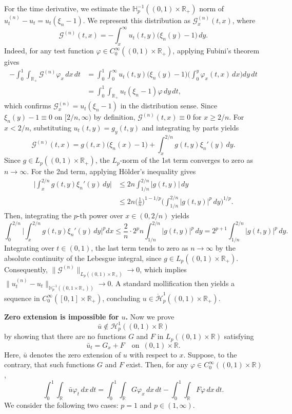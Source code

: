 \documentclass[reqno]{amsart}
\numberwithin{equation}{section}
\theoremstyle{plain}
\theoremstyle{definition}
\def\bR{\mathbb{R}}
\def\bH{\mathbb{H}}
\def\cH{\mathcal{H}}
\begin{document}
For the time derivative, we estimate the $\bH^{-1}_p((0,1)\times \bR_+)$ norm of $u^{(n)}_t - u_t = u_t(\xi_n - 1)$.
We represent this distribution as $\mathcal{G}^{(n)}_x(t,x)$, where
$$
\mathcal{G}^{(n)}(t,x) = -\int_x^\infty u_t(t,y)\big(\xi_n(y) - 1\big)\,dy.
$$
Indeed, for any test function $\varphi \in C_0^\infty((0,1)\times \bR_+)$, applying Fubini's theorem gives
\begin{align*}
-\int_0^1 \int_{\bR_+} \mathcal{G}^{(n)} \varphi_x \,dx\,dt &= \int_0^1 \int_0^\infty u_t(t,y)\big(\xi_n(y) - 1\big) \bigg(\int_0^y \varphi_x(t,x)\,dx\bigg) dy\,dt \\
&= \int_0^1 \int_{\bR_+} u_t(\xi_n - 1) \varphi \,dy\,dt,    
\end{align*}
which confirms $\mathcal{G}^{(n)}_x = u_t(\xi_n - 1)$ in the distribution sense.
Since $\xi_n(y) - 1 \equiv 0$ on $[2/n, \infty)$ by definition, $\mathcal{G}^{(n)}(t,x) \equiv 0$ for $x \ge 2/n$. 
For $x < 2/n$, substituting $u_t(t, y) = g_y(t, y)$ and integrating by parts yields
$$
\mathcal{G}^{(n)}(t,x) = g(t,x)\big(\xi_n(x) - 1\big) + \int_x^{2/n} g(t,y)\xi_n'(y)\,dy.
$$
Since $g \in L_p((0,1)\times \bR_+)$, the $L_p$-norm of the 1st term converges to zero as $n \to \infty$.
For the 2nd term, applying H\"older's inequality gives
\begin{align*}
    \bigg| \int_x^{2/n} g(t,y)\xi_n'(y)\,dy \bigg| &\le 2n \int_{1/n}^{2/n} |g(t,y)|\,dy \\
    &\le 2n \bigg(\frac{1}{n}\bigg)^{1-1/p} \bigg( \int_{1/n}^{2/n} |g(t,y)|^p\,dy \bigg)^{1/p}.
\end{align*}
Then, integrating the $p$-th power over $x \in (0, 2/n)$ yields
$$
\int_0^{2/n} \bigg| \int_x^{2/n} g(t,y)\xi_n'(y)\,dy \bigg|^p dx \le \frac{2}{n} \cdot 2^p n \int_{1/n}^{2/n} |g(t,y)|^p\,dy = 2^{p+1} \int_{1/n}^{2/n} |g(t,y)|^p\,dy.
$$
Integrating over $t \in (0,1)$, the last term tends to zero as $n \to \infty$ by the absolute continuity of the Lebesgue integral, since $g \in L_p((0,1)\times \bR_+)$.
Consequently, $\|\mathcal{G}^{(n)}\|_{L_p((0,1)\times \bR_+)} \to 0$, which implies $\|u^{(n)}_t - u_t\|_{\bH^{-1}_p((0, 1 \times \bR_+) )} \to 0$.
A standard mollification then yields a sequence in $C_0^\infty([0,1]\times \bR_+)$, concluding $u\in \mathring{\cH}^1_p((0,1)\times \bR_+)$.
 
\bigskip
\noindent 
\textbf{Zero extension is impossible for $u$.}
Now we prove
$$
\bar{u}\notin \cH^1_{p}((0,1)\times \bR)
$$
by showing that there are no functions $G$ and $F$ in $L_p((0,1)\times \bR)$ satisfying 
$$
\bar{u}_t=G_x+F \quad \text{on }\, (0, 1)\times \bR.
$$
Here, $\bar{u}$ denotes the zero extension of $u$ with respect to $x$.
Suppose, to the contrary,  that such functions $G$ and $F$ exist.
Then,  for any $\varphi\in C^\infty_0((0,1)\times \bR)$,
\begin{equation}		\label{240812_E2}
\int_0^1 \int_{\bR} \bar{u}\varphi_t\,dx\,dt=\int_0^1\int_{\bR} G \varphi_x\,dx\,dt-\int_0^1\int_{\bR} F\varphi\,dx\,dt. 
\end{equation}
We consider the following two cases: $p = 1$ and $p \in (1, \infty)$.
\end{document}
